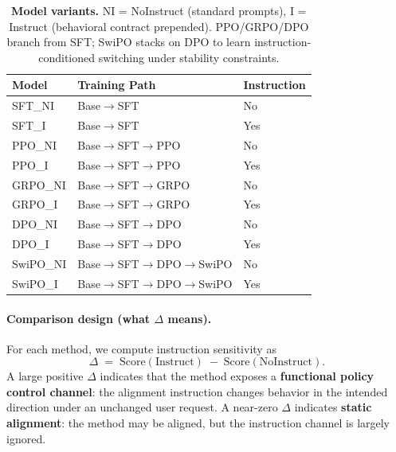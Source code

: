 \begin{table}[ht!]
\centering
\normalsize
\renewcommand{\arraystretch}{1.2}
\begin{tabular}{@{}lll@{}}
\toprule
\textbf{Model} & \textbf{Training Path} & \textbf{Instruction} \\
\midrule
SFT\_NI & Base$\rightarrow$SFT & No \\
\hline
SFT\_I & Base$\rightarrow$SFT & Yes \\
\hline
PPO\_NI & Base$\rightarrow$SFT$\rightarrow$PPO & No \\
\hline
PPO\_I & Base$\rightarrow$SFT$\rightarrow$PPO & Yes \\
\hline
GRPO\_NI & Base$\rightarrow$SFT$\rightarrow$GRPO & No \\
\hline
GRPO\_I & Base$\rightarrow$SFT$\rightarrow$GRPO & Yes \\
\hline
DPO\_NI & Base$\rightarrow$SFT$\rightarrow$DPO & No \\
\hline
DPO\_I & Base$\rightarrow$SFT$\rightarrow$DPO & Yes \\
\hline
SwiPO\_NI & Base$\rightarrow$SFT$\rightarrow$DPO$\rightarrow$SwiPO & No \\
\hline
SwiPO\_I & Base$\rightarrow$SFT$\rightarrow$DPO$\rightarrow$SwiPO & Yes \\
\bottomrule
\end{tabular}
\caption{\textbf{Model variants.} NI = NoInstruct (standard prompts), I = Instruct (behavioral contract prepended). PPO/GRPO/DPO branch from SFT; SwiPO stacks on DPO to learn instruction-conditioned switching under stability constraints.}
\label{tab:model_variants}
\vspace{-4mm}
\end{table}

\vspace{-0.2em}
\paragraph{\textbf{Comparison design (what $\Delta$ means).}}
For each method, we compute instruction sensitivity as
\[
\Delta \;=\; \text{Score}(\text{Instruct}) \;-\; \text{Score}(\text{NoInstruct}).
\]
A large positive $\Delta$ indicates that the method exposes a \textbf{functional policy control channel}:
the alignment instruction changes behavior in the intended direction under an unchanged user request.
A near-zero $\Delta$ indicates \textbf{static alignment}: the method may be aligned, but the instruction channel is largely ignored.

